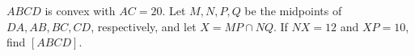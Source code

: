 $ABCD$ is convex with $AC=20$. Let $M,N,P,Q$ be the midpoints of $DA,AB,BC,CD$, respectively, and let $X=MP\cap NQ$. If $NX=12$ and $XP=10$, find $[ABCD]$.

